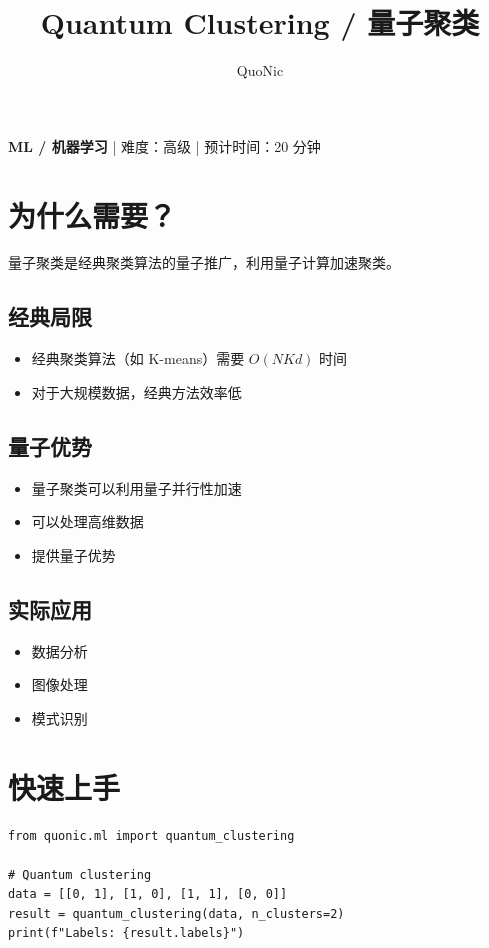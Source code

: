 \documentclass[12pt,a4paper]{article}
\title{Quantum Clustering / 量子聚类}
\author{QuoNic}
\date{}
\begin{document}
\maketitle

\begin{center}
\textbf{ML / 机器学习} | 难度：高级 | 预计时间：20 分钟
\end{center}

\tableofcontents
\newpage

\section{为什么需要？}

量子聚类是经典聚类算法的量子推广，利用量子计算加速聚类。

\subsection{经典局限}
\begin{itemize}
  \item 经典聚类算法（如 K-means）需要 $O(NKd)$ 时间
  \item 对于大规模数据，经典方法效率低
\end{itemize}

\subsection{量子优势}
\begin{itemize}
  \item 量子聚类可以利用量子并行性加速
  \item 可以处理高维数据
  \item 提供量子优势
\end{itemize}

\subsection{实际应用}
\begin{itemize}
  \item 数据分析
  \item 图像处理
  \item 模式识别
\end{itemize}

\section{快速上手}

\begin{lstlisting}[style=python]
from quonic.ml import quantum_clustering

# Quantum clustering
data = [[0, 1], [1, 0], [1, 1], [0, 0]]
result = quantum_clustering(data, n_clusters=2)
print(f"Labels: {result.labels}")
\end{lstlisting}
\end{document}
